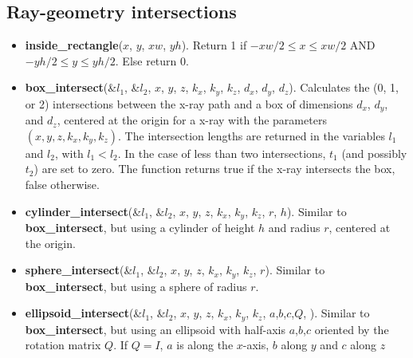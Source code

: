 \subsection{Ray-geometry intersections}
\begin{itemize}
\item {\bfseries inside\_rectangle}($x$, $y$, $xw$, $yh$).
  Return 1 if $-xw/2 \leq x \leq xw/2$ AND $-yh/2 \leq y \leq yh/2$.
  Else return 0.
\item {\bfseries box\_intersect}(\&$l_1$, \&$l_2$, $x$, $y$, $z$, $k_x$, $k_y$, $k_z$,
  $d_x$, $d_y$, $d_z$). Calculates the (0, 1, or 2) intersections between
  the x-ray path and a box of dimensions $d_x$, $d_y$, and $d_z$,
  centered at the origin for a x-ray with the parameters
  $(x,y,z,k_x,k_y,k_z)$. The intersection lengths are returned
  in the variables $l_1$ and $l_2$, with $l_1 < l_2$. In the case
  of less than two intersections, $t_1$ (and possibly $t_2$) are set to
  zero. The function returns true if the x-ray intersects the box,
  false otherwise.
\item {\bfseries cylinder\_intersect}(\&$l_1$, \&$l_2$, $x$, $y$, $z$, $k_x$, $k_y$, $k_z$,
  $r$, $h$).  Similar to {\bfseries box\_intersect}, but using a cylinder of height $h$ and radius $r$,
  centered at the origin.
\item {\bfseries sphere\_intersect}(\&$l_1$, \&$l_2$, $x$, $y$, $z$, $k_x$, $k_y$, $k_z$,
  $r$). Similar to {\bfseries box\_intersect}, but using a sphere
  of radius $r$.
\item {\bfseries ellipsoid\_intersect}(\&$l_1$, \&$l_2$, $x$, $y$, $z$, $k_x$, $k_y$, $k_z$,
  $a$,$b$,$c$,$Q$, ). Similar to {\bfseries box\_intersect}, but using an ellipsoid with half-axis $a$,$b$,$c$ oriented by the rotation matrix $Q$.
  If $Q=I$, $a$ is along the $x$-axis, $b $ along $y$ and $c$ along $z$
\end{itemize}

